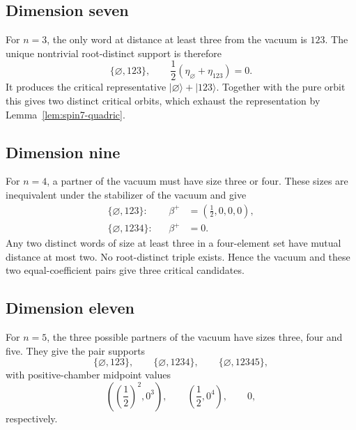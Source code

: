 \documentclass{article}
\theoremstyle{definition}
\theoremstyle{remark}
\newcommand{\ket}[1]{\lvert #1\rangle}
\begin{document}
\subsection{Dimension seven}
\label{sec:odd-seven}

For $n=3$, the only word at distance at least three from the vacuum is
$123$.  The unique nontrivial root-distinct support is therefore
\[
 \{\varnothing,123\},
 \qquad
 \frac12(\eta_\varnothing+\eta_{123})=0.
\]
It produces the critical representative
$\ket\varnothing+\ket{123}$.  Together with the pure orbit this gives two
distinct critical orbits, which exhaust the representation by
Lemma~\ref{lem:spin7-quadric}.

\subsection{Dimension nine}
\label{sec:odd-nine}

For $n=4$, a partner of the vacuum must have size three or four.  These
sizes are inequivalent under the stabilizer of the vacuum and give
\[
\begin{aligned}
 \{\varnothing,123\}:&
 &\beta^+&=\left(\frac12,0,0,0\right),\\
 \{\varnothing,1234\}:&
 &\beta^+&=0.
\end{aligned}
\]
Any two distinct words of size at least three in a four-element set have
mutual distance at most two.  No root-distinct triple exists.  Hence the
vacuum and these two equal-coefficient pairs give three critical
candidates.

\subsection{Dimension eleven}
\label{sec:odd-eleven}

For $n=5$, the three possible partners of the vacuum have sizes three,
four and five.  They give the pair supports
\[
 \{\varnothing,123\},\qquad
 \{\varnothing,1234\},\qquad
 \{\varnothing,12345\},
\]
with positive-chamber midpoint values
\[
 \left(\left(\frac12\right)^2,0^3\right),
 \qquad
 \left(\frac12,0^4\right),
 \qquad
 0,
\]
respectively.
\end{document}
